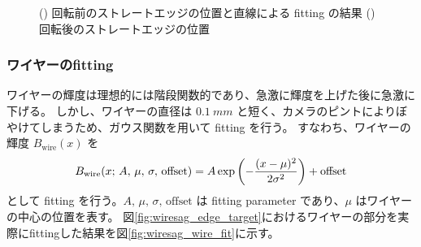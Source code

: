 \documentclass[../../main.tex]{subfiles}
\begin{document}
\begin{figure}[H]
\begin{minipage}[b]{0.5\hsize}
        \subcaption{}
        \label{fig:wiresag_straight_edge_positions_rot}
    \end{minipage}
    \caption{() 回転前のストレートエッジの位置と直線による fitting の結果
             () 回転後のストレートエッジの位置
             }
    \label{fig:wiresag_straight_edge}
\end{figure}

\subsubsection{ワイヤーのfitting}
ワイヤーの輝度は理想的には階段関数的であり、急激に輝度を上げた後に急激に下げる。
しかし、ワイヤーの直径は $\SI{0.1}{mm}$ と短く、カメラのピントによりぼやけてしまうため、ガウス関数を用いて fitting を行う。
すなわち、ワイヤーの輝度 $B_{\mathrm{wire}}(x)$ を
\begin{align}
    B_{\mathrm{wire}}(x;\,A,\,\mu,\,\sigma,\,\text{offset}) = A\exp\qty(-\dfrac{(x-\mu)^2}{2\sigma^2}) + \mathrm{offset}
\end{align}
として fitting を行う。$A,\,\mu,\,\sigma,\,\text{offset}$ は fitting parameter であり、$\mu$ はワイヤーの中心の位置を表す。
図\ref{fig:wiresag_edge_target}におけるワイヤーの部分を実際にfittingした結果を図\ref{fig:wiresag_wire_fit}に示す。
\end{document}

